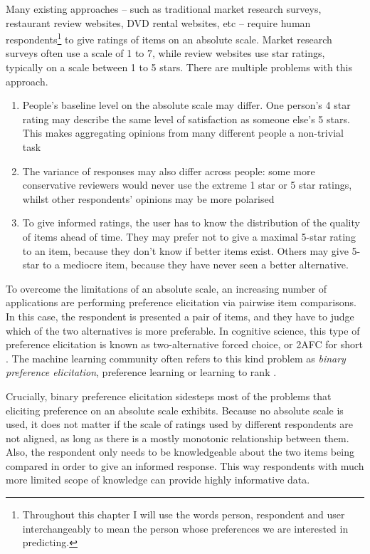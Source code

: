 Many existing approaches -- such as traditional market research surveys, restaurant review websites, DVD rental websites, etc -- require human respondents\footnote{Throughout this chapter I will use the words person, respondent and user interchangeably to mean the person whose preferences we are interested in predicting.} to give ratings of items on an absolute scale. Market research surveys often use a scale of 1 to 7, while review websites use star ratings, typically on a scale between 1 to 5 stars. There are multiple problems with this approach.
\begin{enumerate}
	\item People's baseline level on the absolute scale may differ. One person's 4 star rating may describe the same level of satisfaction as someone else's 5 stars. This makes aggregating opinions from many different people a non-trivial task
	\item The variance of responses may also differ across people: some more conservative reviewers would never use the extreme 1 star or 5 star ratings, whilst other respondents' opinions may be more polarised
	\item To give informed ratings, the user has to know the distribution of the quality of items ahead of time. They may prefer not to give a maximal 5-star rating to an item, because they don't know if better items exist. Others may give 5-star to a mediocre item, because they have never seen a better alternative.
\end{enumerate} 

To overcome the limitations of an absolute scale, an increasing number of applications are performing preference elicitation via pairwise item comparisons. In this case, the respondent is presented a pair of items, and they have to judge which of the two alternatives is more preferable. In cognitive science, this type of preference elicitation is known as two-alternative forced choice, or 2AFC for short \citep{Fechner1860,Platt1999,Huszar2010}. The machine learning community often refers to this kind problem as \emph{binary preference elicitation}, preference learning or learning to rank \citep{Chu2005,furnkranz2010}.

Crucially, binary preference elicitation sidesteps most of the problems that eliciting preference on an absolute scale exhibits. Because no absolute scale is used, it does not matter if the scale of ratings used by different respondents are not aligned, as long as there is a mostly monotonic relationship between them. Also, the respondent only needs to be knowledgeable about the two items being compared in order to give an informed response. This way respondents with much more limited scope of knowledge can provide highly informative data.

